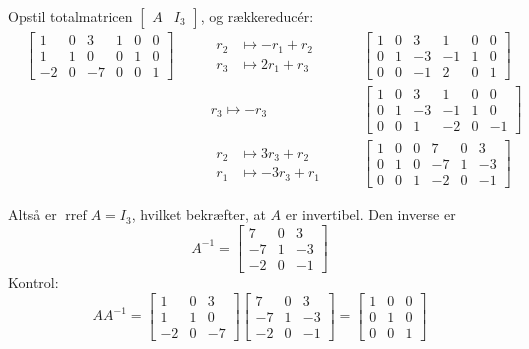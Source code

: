 \begin{solution}
    Opstil totalmatricen $\left[\begin{array}{ll}A & I_3\end{array}\right]$, og rækkereducér:
\[
\begin{alignedat}{3}
& \left[\begin{array}{cccccc}
1 & 0 & 3 & 1 & 0 & 0 \\
1 & 1 & 0 & 0 & 1 & 0 \\
-2 & 0 & -7 & 0 & 0 & 1
\end{array}\right]
& \quad & \begin{aligned}
    r_2 &\mapsto -r_1 + r_2 \\
    r_3 &\mapsto 2 r_1 + r_3
\end{aligned}
& \quad & \left[\begin{array}{cccccc}
1 & 0 & 3 & 1 & 0 & 0 \\
0 & 1 & -3 & -1 & 1 & 0 \\
0 & 0 & -1 & 2 & 0 & 1
\end{array}\right] \\[10pt]
& & \quad & r_3 \mapsto -r_3
& \quad & \left[\begin{array}{cccccc}
1 & 0 & 3 & 1 & 0 & 0 \\
0 & 1 & -3 & -1 & 1 & 0 \\
0 & 0 & 1 & -2 & 0 & -1
\end{array}\right] \\[10pt]
& & \quad & \begin{aligned}
    r_2 &\mapsto 3 r_3 + r_2 \\
    r_1 &\mapsto -3 r_3 + r_1
\end{aligned}
& \quad & \left[\begin{array}{cccccc}
1 & 0 & 0 & 7 & 0 & 3 \\
0 & 1 & 0 & -7 & 1 & -3 \\
0 & 0 & 1 & -2 & 0 & -1
\end{array}\right]
\end{alignedat}
\]

Altså er \(\operatorname{rref}A = I_3\), hvilket bekræfter, at \( A \) er invertibel. Den inverse er
\[
A^{-1} = \left[\begin{array}{ccc}
7 & 0 & 3 \\
-7 & 1 & -3 \\
-2 & 0 & -1
\end{array}\right]
\]
Kontrol:
\[
AA^{-1}=\left[\begin{array}{ccc}
1 & 0 & 3 \\
1 & 1 & 0 \\
-2 & 0 & -7
\end{array}\right]\left[\begin{array}{ccc}
7 & 0 & 3 \\
-7 & 1 & -3 \\
-2 & 0 & -1
\end{array}\right]=\left[\begin{array}{lll}
1 & 0 & 0 \\
0 & 1 & 0 \\
0 & 0 & 1
\end{array}\right]
\]

\end{solution}

